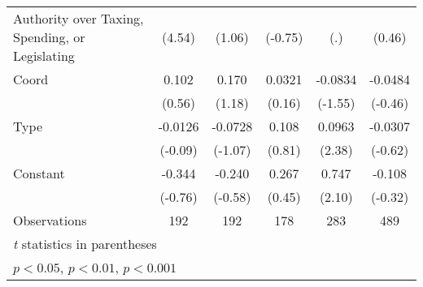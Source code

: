 {\begin{tabular}{l*{5}{c}}
Authority over Taxing, Spending, or Legislating&   (4.54)         &   (1.06)         &  (-0.75)         &      (.)         &   (0.46)         \\
\addlinespace
Coord           &    0.102         &    0.170         &   0.0321         &  -0.0834         &  -0.0484         \\
                &   (0.56)         &   (1.18)         &   (0.16)         &  (-1.55)         &  (-0.46)         \\
\addlinespace
Type            &  -0.0126         &  -0.0728         &    0.108         &   0.0963\sym{*}  &  -0.0307         \\
                &  (-0.09)         &  (-1.07)         &   (0.81)         &   (2.38)         &  (-0.62)         \\
\addlinespace
Constant        &   -0.344         &   -0.240         &    0.267         &    0.747\sym{*}  &   -0.108         \\
                &  (-0.76)         &  (-0.58)         &   (0.45)         &   (2.10)         &  (-0.32)         \\
\midrule
Observations    &      192         &      192         &      178         &      283         &      489         \\
\bottomrule
\multicolumn{6}{l}{\footnotesize \textit{t} statistics in parentheses}\\
\multicolumn{6}{l}{\footnotesize \sym{*} \(p<0.05\), \sym{**} \(p<0.01\), \sym{***} \(p<0.001\)}\\
\end{tabular}
}
